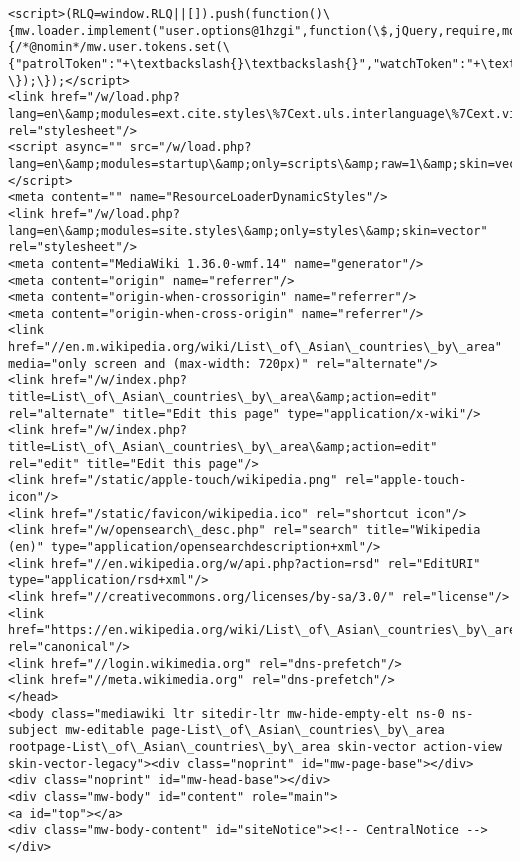 \documentclass[11pt]{article}
\begin{document}
\begin{Verbatim}[commandchars=\\\{\}]
<script>(RLQ=window.RLQ||[]).push(function()\{mw.loader.implement("user.options@1hzgi",function(\$,jQuery,require,module)\{/*@nomin*/mw.user.tokens.set(\{"patrolToken":"+\textbackslash{}\textbackslash{}","watchToken":"+\textbackslash{}\textbackslash{}","csrfToken":"+\textbackslash{}\textbackslash{}"\});
\});\});</script>
<link href="/w/load.php?lang=en\&amp;modules=ext.cite.styles\%7Cext.uls.interlanguage\%7Cext.visualEditor.desktopArticleTarget.noscript\%7Cext.wikimediaBadges\%7Cjquery.makeCollapsible.styles\%7Cjquery.tablesorter.styles\%7Cskins.vector.styles.legacy\%7Cwikibase.client.init\&amp;only=styles\&amp;skin=vector" rel="stylesheet"/>
<script async="" src="/w/load.php?lang=en\&amp;modules=startup\&amp;only=scripts\&amp;raw=1\&amp;skin=vector"></script>
<meta content="" name="ResourceLoaderDynamicStyles"/>
<link href="/w/load.php?lang=en\&amp;modules=site.styles\&amp;only=styles\&amp;skin=vector" rel="stylesheet"/>
<meta content="MediaWiki 1.36.0-wmf.14" name="generator"/>
<meta content="origin" name="referrer"/>
<meta content="origin-when-crossorigin" name="referrer"/>
<meta content="origin-when-cross-origin" name="referrer"/>
<link href="//en.m.wikipedia.org/wiki/List\_of\_Asian\_countries\_by\_area" media="only screen and (max-width: 720px)" rel="alternate"/>
<link href="/w/index.php?title=List\_of\_Asian\_countries\_by\_area\&amp;action=edit" rel="alternate" title="Edit this page" type="application/x-wiki"/>
<link href="/w/index.php?title=List\_of\_Asian\_countries\_by\_area\&amp;action=edit" rel="edit" title="Edit this page"/>
<link href="/static/apple-touch/wikipedia.png" rel="apple-touch-icon"/>
<link href="/static/favicon/wikipedia.ico" rel="shortcut icon"/>
<link href="/w/opensearch\_desc.php" rel="search" title="Wikipedia (en)" type="application/opensearchdescription+xml"/>
<link href="//en.wikipedia.org/w/api.php?action=rsd" rel="EditURI" type="application/rsd+xml"/>
<link href="//creativecommons.org/licenses/by-sa/3.0/" rel="license"/>
<link href="https://en.wikipedia.org/wiki/List\_of\_Asian\_countries\_by\_area" rel="canonical"/>
<link href="//login.wikimedia.org" rel="dns-prefetch"/>
<link href="//meta.wikimedia.org" rel="dns-prefetch"/>
</head>
<body class="mediawiki ltr sitedir-ltr mw-hide-empty-elt ns-0 ns-subject mw-editable page-List\_of\_Asian\_countries\_by\_area rootpage-List\_of\_Asian\_countries\_by\_area skin-vector action-view skin-vector-legacy"><div class="noprint" id="mw-page-base"></div>
<div class="noprint" id="mw-head-base"></div>
<div class="mw-body" id="content" role="main">
<a id="top"></a>
<div class="mw-body-content" id="siteNotice"><!-- CentralNotice --></div>

\end{Verbatim}
\end{document}
